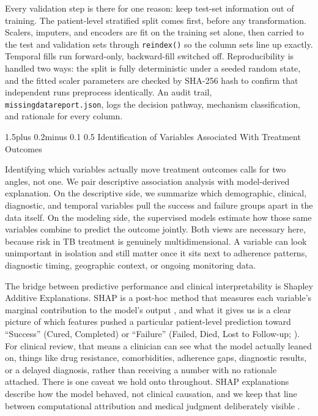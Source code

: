 \documentclass[12pt]{article}
\makeatletter
\renewcommand{\_}{\textunderscore\allowbreak}
\renewcommand{\subsection}{\@startsection{subsection}{2}{0pt}%
  {1.5\baselineskip plus 0.2\baselineskip minus 0.1\baselineskip}%
  {0.5\baselineskip}%
  {\bfseries\normalsize}}
\makeatother
\begin{document}
Every validation step is there for one reason: keep test-set information out of training. The patient-level stratified split comes first, before any transformation. Scalers, imputers, and encoders are fit on the training set alone, then carried to the test and validation sets through \texttt{reindex()} so the column sets line up exactly. Temporal fills run forward-only, backward-fill switched off. Reproducibility is handled two ways: the split is fully deterministic under a seeded random state, and the fitted scaler parameters are checked by SHA-256 hash to confirm that independent runs preprocess identically. An audit trail, \texttt{missing\_data\_report.json}, logs the decision pathway, mechanism classification, and rationale for every column.

\subsection{Identification of Variables Associated With Treatment Outcomes}

Identifying which variables actually move treatment outcomes calls for two angles, not one. We pair descriptive association analysis with model-derived explanation. On the descriptive side, we summarize which demographic, clinical, diagnostic, and temporal variables pull the success and failure groups apart in the data itself. On the modeling side, the supervised models estimate how those same variables combine to predict the outcome jointly. Both views are necessary here, because risk in TB treatment is genuinely multidimensional. A variable can look unimportant in isolation and still matter once it sits next to adherence patterns, diagnostic timing, geographic context, or ongoing monitoring data.

The bridge between predictive performance and clinical interpretability is Shapley Additive Explanations. SHAP is a post-hoc method that measures each variable's marginal contribution to the model's output \citep{lundberg2017unified}, and what it gives us is a clear picture of which features pushed a particular patient-level prediction toward ``Success'' (Cured, Completed) or ``Failure'' (Failed, Died, Lost to Follow-up; \citealp{ref15}). For clinical review, that means a clinician can see what the model actually leaned on, things like drug resistance, comorbidities, adherence gaps, diagnostic results, or a delayed diagnosis, rather than receiving a number with no rationale attached. There is one caveat we hold onto throughout. SHAP explanations describe how the model behaved, not clinical causation, and we keep that line between computational attribution and medical judgment deliberately visible \citep{ref26, ref27}.
\end{document}
